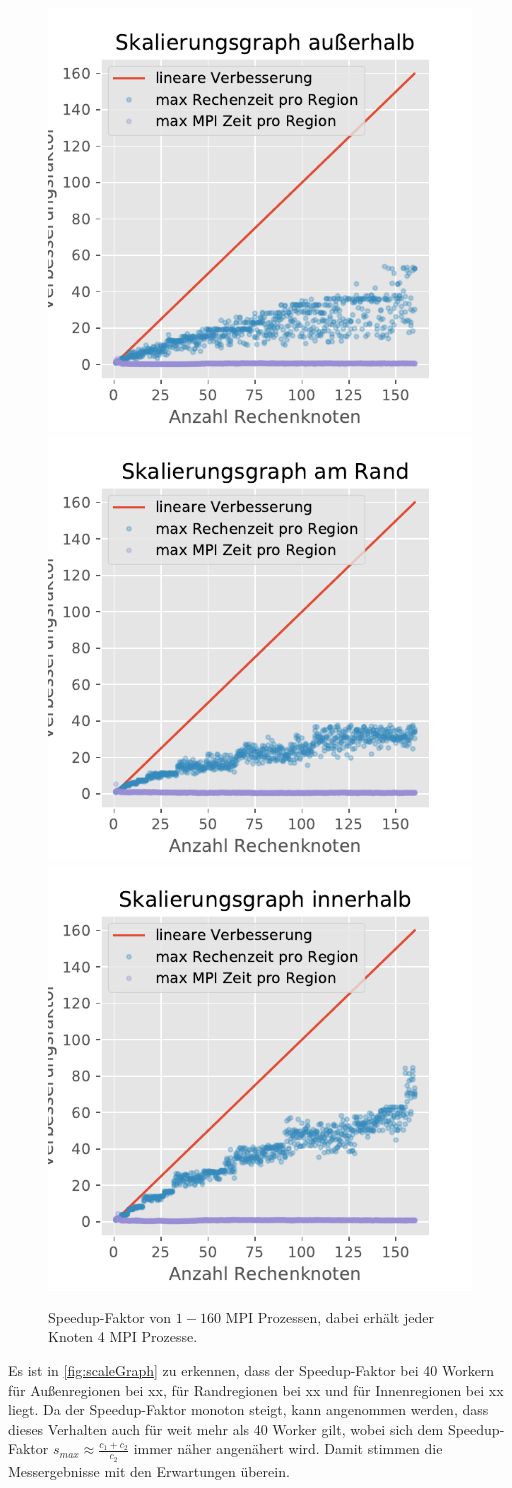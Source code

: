 \begin{figure}[h!]
	\centering
	\includegraphics[width=0.32\linewidth]{img/Evaluation/scale_graph_outside_more_nodes}
	\includegraphics[width=0.32\linewidth]{img/Evaluation/scale_graph_border_more_nodes}
	\includegraphics[width=0.32\linewidth]{img/Evaluation/scale_graph_inside_more_nodes}
	\caption{Speedup-Faktor von \( 1-160 \) MPI Prozessen, dabei erhält jeder Knoten 4 MPI Prozesse.}
	\label{fig:scaleGraphMoreNodes}
\end{figure}

Es ist in \autoref{fig:scaleGraph} zu erkennen, dass der Speedup-Faktor bei 40 Workern für Außenregionen bei xx, für Randregionen bei xx und für Innenregionen bei xx liegt. Da der Speedup-Faktor monoton steigt, kann angenommen werden, dass dieses Verhalten auch für weit mehr als 40 Worker gilt, wobei sich dem Speedup-Faktor \( s_{max} \approx \frac{c_1 + c_2}{c_2} \) immer näher angenähert wird.
Damit stimmen die Messergebnisse mit den Erwartungen überein.


